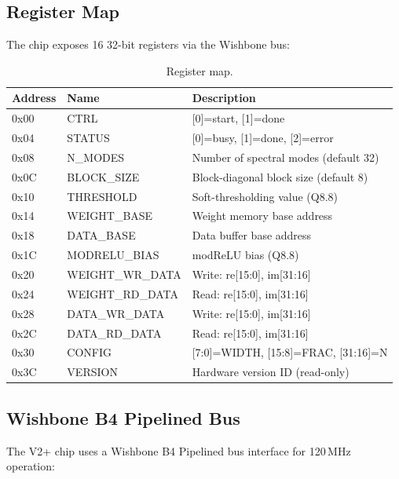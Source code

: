\documentclass[11pt,a4paper]{article}
\theoremstyle{definition}
\theoremstyle{remark}
\begin{document}
\subsection{Register Map}

The chip exposes 16 32-bit registers via the Wishbone bus:

\begin{table}[h]
\centering
\caption{Register map.}
\label{tab:registers}
\begin{tabular}{lll}
\toprule
\textbf{Address} & \textbf{Name} & \textbf{Description} \\
\midrule
0x00 & CTRL & [0]=start, [1]=done \\
0x04 & STATUS & [0]=busy, [1]=done, [2]=error \\
0x08 & N\_MODES & Number of spectral modes (default 32) \\
0x0C & BLOCK\_SIZE & Block-diagonal block size (default 8) \\
0x10 & THRESHOLD & Soft-thresholding value (Q8.8) \\
0x14 & WEIGHT\_BASE & Weight memory base address \\
0x18 & DATA\_BASE & Data buffer base address \\
0x1C & MODRELU\_BIAS & modReLU bias (Q8.8) \\
0x20 & WEIGHT\_WR\_DATA & Write: re[15:0], im[31:16] \\
0x24 & WEIGHT\_RD\_DATA & Read: re[15:0], im[31:16] \\
0x28 & DATA\_WR\_DATA & Write: re[15:0], im[31:16] \\
0x2C & DATA\_RD\_DATA & Read: re[15:0], im[31:16] \\
0x30 & CONFIG & [7:0]=WIDTH, [15:8]=FRAC, [31:16]=N \\
0x3C & VERSION & Hardware version ID (read-only) \\
\bottomrule
\end{tabular}
\end{table}

\subsection{Wishbone B4 Pipelined Bus}

The V2+ chip uses a Wishbone B4 Pipelined bus interface for 120\,MHz operation:
\end{document}

